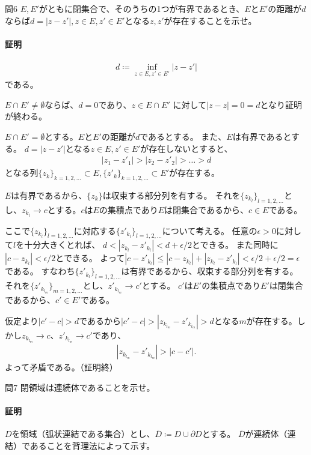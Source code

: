 \begin{mysimplebox}{問6}
    $E, E'$がともに閉集合で、そのうちの1つが有界であるとき、$E$と$E'$の距離が$d$ならば$d=|z-z'|, z\in E, z'\in E'$となる$z, z'$が存在することを示せ。
\end{mysimplebox}
\paragraph{証明}
\begin{align*}
    d\coloneqq \inf_{z\in E, z'\in E'}|z-z'|
\end{align*}
である。

$E\cap E'\neq \emptyset$ならば、$d=0$であり、$z\in E\cap E'$
に対して$|z-z|=0=d$となり証明が終わる。

$E\cap E'=\emptyset$とする。$E$と$E'$の距離が$d$であるとする。
また、$E$は有界であるとする。
$d=|z-z'|$となる$z\in E, z'\in E'$が存在しないとすると、
\begin{align*}
    |z_1-z'_1|>|z_2-z'_2|>\dots>d
\end{align*}
となる列$\{z_k\}_{k=1,2,\dots}\subset E, \{z'_k\}_{k=1,2,\dots}\subset E'$が存在する。

$E$は有界であるから、$\{z_k\}$は収束する部分列を有する。
それを$\{z_{k_l}\}_{l=1,2,\dots}$とし、$z_{k_l}\longrightarrow c$とする。$c$は$E$の集積点であり$E$は閉集合であるから、$c\in E$である。

ここで$\{z_{k_l}\}_{l=1,2,\dots}$に対応する$\{z'_{k_l}\}_{l=1,2,\dots}$について考える。
任意の$\epsilon>0$に対して$l$を十分大きくとれば、
$d<|z_{k_l}-z'_{k_l}|<d+\epsilon/2$とできる。
また同時に$|c-z_{k_l}|<\epsilon/2$とできる。
よって$|c-z'_{k_l}|\le|c-z_{k_l}|+|z_{k_l}-z'_{k_l}|<\epsilon/2+\epsilon/2=\epsilon$である。
すなわち$\{z'_{k_l}\}_{l=1,2,\dots}$は有界であるから、収束する部分列を有する。
それを$\{z'_{k_{l_m}}\}_{m=1,2,\dots}$とし、$z'_{k_{l_m}}\rightarrow c'$とする。
$c'$は$E'$の集積点であり$E'$は閉集合であるから、$c'\in E'$である。

仮定より$|c'-c|>d$であるから$|c'-c|>|z_{k_{l_m}}-z'_{k_{l_m}}|>d$となる$m$が存在する。しかし$z_{k_{l_m}}\longrightarrow c$、$z'_{k_{l_m}}\longrightarrow c'$であり、
\begin{align*}
    |z_{k_{l_m}}-z'_{k_{l_m}}|>|c-c'|.
\end{align*}
よって矛盾である。（証明終）

\begin{mysimplebox}{問7}
    閉領域は連続体であることを示せ。
\end{mysimplebox}
\paragraph{証明}
$D$を領域（弧状連結である集合）とし、$\overline{D}\coloneqq D\cup\partial D$とする。
$\overline{D}$が連続体（連結）であることを背理法によって示す。

